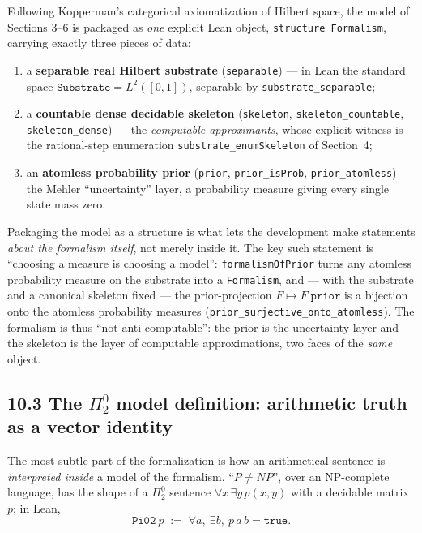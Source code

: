 \documentclass[11pt,a4paper]{report}
\begin{document}
Following Kopperman's categorical axiomatization of Hilbert space, the model of
Sections 3--6 is packaged as \emph{one} explicit Lean object,
\texttt{structure Formalism}, carrying exactly three pieces of data:

\begin{enumerate}
\item
  a \textbf{separable real Hilbert substrate} (\texttt{separable}) --- in Lean the
  standard space \(\texttt{Substrate} = L^{2}([0,1])\), separable by
  \texttt{substrate\_separable};
\item
  a \textbf{countable dense decidable skeleton} (\texttt{skeleton},
  \texttt{skeleton\_countable}, \texttt{skeleton\_dense}) --- the
  \emph{computable approximants}, whose explicit witness is the rational-step
  enumeration \texttt{substrate\_enumSkeleton} of Section~4;
\item
  an \textbf{atomless probability prior} (\texttt{prior},
  \texttt{prior\_isProb}, \texttt{prior\_atomless}) --- the Mehler ``uncertainty''
  layer, a probability measure giving every single state mass zero.
\end{enumerate}

Packaging the model as a structure is what lets the development make statements
\emph{about the formalism itself}, not merely inside it. The key such statement is
``choosing a measure is choosing a model'': \texttt{formalismOfPrior} turns any
atomless probability measure on the substrate into a \texttt{Formalism}, and ---
with the substrate and a canonical skeleton fixed --- the prior-projection
\(F \mapsto F.\mathtt{prior}\) is a bijection onto the atomless probability
measures (\texttt{prior\_surjective\_onto\_atomless}). The formalism is thus
``not anti-computable'': the prior is the uncertainty layer and the skeleton is
the layer of computable approximations, two faces of the \emph{same} object.

\subsection*{10.3 The \(\Pi^0_2\) model definition: arithmetic truth as a vector
identity}

The most subtle part of the formalization is how an arithmetical sentence is
\emph{interpreted inside} a model of the formalism. ``\(P \neq NP\)'', over an
NP-complete language, has the shape of a \(\Pi^0_2\) sentence
\(\forall x\,\exists y\,p(x,y)\) with a decidable matrix \(p\); in Lean,
\[
  \texttt{Pi02}\ p \;:=\; \forall a,\ \exists b,\ p\,a\,b = \texttt{true}.
\]
\end{document}
